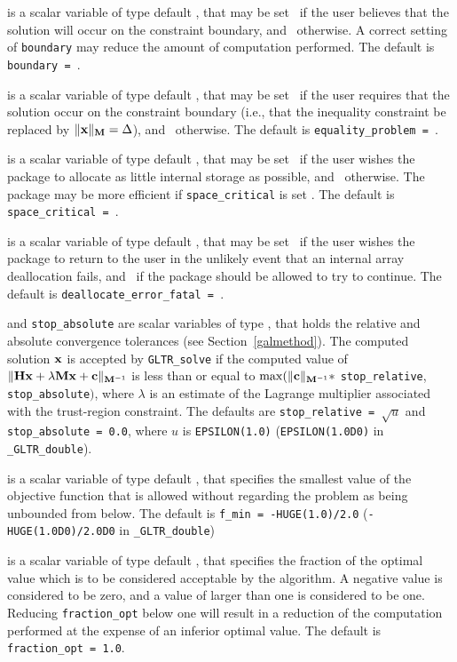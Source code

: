 \documentclass{galahad}
\newcommand{\packagename}{GL\-TR}
\newcommand{\fullpackagename}{\libraryname\_\packagename}
\begin{document}
\begin{description}
 is a scalar variable of type default \logical, that
may be set \true\ if the user believes that the solution will
occur on the constraint boundary, and \false\
otherwise. A correct setting of {\tt boundary} may reduce the amount of
computation performed.
The default is {\tt boundary = \false}.

 is a scalar variable of type default \logical, that
may be set \true\ if the user requires that the solution
occur on the constraint boundary (i.e., that the inequality constraint be
replaced by $\|{\mathbf{x}}\|_{{\mathbf{M}}} = \Delta$), and \false\ otherwise.
The default is {\tt equality\_problem = \false}.

 is a scalar variable of type default \logical, that
may be set \true\ if the user wishes the package to allocate as little
internal storage as possible, and \false\ otherwise. The package may
be more efficient if {\tt space\_critical} is set \false.
The default is {\tt space\_critical = \false}.

 is a scalar variable of type default \logical,
that may be set \true\ if the user wishes the package to return to the user
in the unlikely event that an internal array deallocation fails,
and \false\ if the package should be allowed to try to continue.
The default is {\tt deallocate\_error\_fatal = \false}.

 and {\tt stop\_absolute} are scalar variables of type
\realdp, that holds the
relative and absolute convergence tolerances (see Section~\ref{galmethod}).
The computed solution ${\mathbf{x}}$ is accepted by {\tt \packagename\_solve}
if the computed value of
$\|{\mathbf{H}} {\mathbf{x}} + \lambda {\mathbf{M}} {\mathbf{x}} + {\mathbf{c}}\|_{{{\mathbf{M}}^{-1}}} $ is less than or equal
to $\max (\| {\mathbf{c}}\|_{{\mathbf{M}}^{-1}} \ast$ {\tt stop\_relative},
{\tt stop\_absolute}$)$, where $\lambda$ is an estimate of the Lagrange
multiplier associated with the trust-region constraint.
The defaults are {\tt stop\_relative = $\sqrt{u}$} and
{\tt stop\_absolute = 0.0},
where $u$ is {\tt EPSILON(1.0)} ({\tt EPSILON(1.0D0)} in
{\tt \fullpackagename\_double}).

 is a scalar variable of type default
\realdp, that specifies the smallest value of the objective function
that is allowed without regarding the problem as being unbounded
from below. The default is {\tt f\_min = -HUGE(1.0)/2.0}
({\tt -HUGE(1.0D0)/2.0D0} in {\tt \fullpackagename\_double})

 is a scalar variable of type default
\realdp, that specifies the fraction
of the optimal value which is to be considered acceptable by the algorithm.
A negative value is considered to be zero, and a value of larger than one
is considered to be one. Reducing {\tt fraction\_opt} below one will result
in a reduction of the computation performed at the expense of an inferior
optimal value.
The default is {\tt fraction\_opt = 1.0}.


\end{description}
\end{document}
